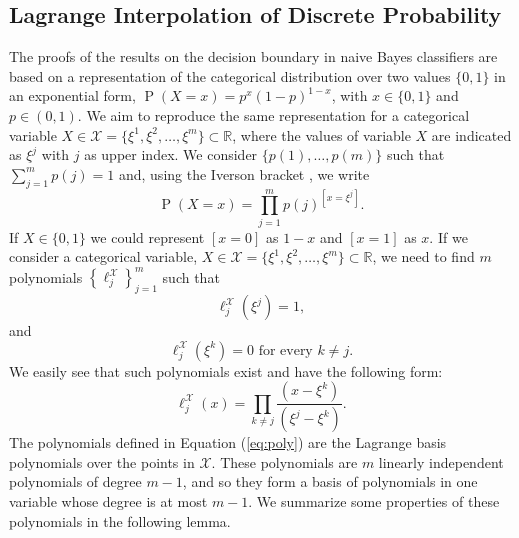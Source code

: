 \documentclass[11pt,a4paper, twoside]{book}
\newcommand{\Pp}{\operatorname{P}}
\newcommand{\nchi}{\mathcal{X}}
\begin{document}
\subsection{Lagrange Interpolation of Discrete Probability}

The proofs of the results on the decision boundary in naive Bayes classifiers are based on a representation of the categorical distribution over two values $\{0,1\}$ in an exponential form, $\Pp(X=x)=p^x(1-p)^{1-x}$, with $x\in \{0,1\}$ and $p\in (0,1)$. We aim to reproduce the same representation for a categorical variable $X \in \nchi=\{\xi^1,\xi^2,\ldots,\xi^m\} \subset \mathbb{R}$, { where the values of variable $X$ are indicated as $\xi^j$ with $j$ as upper index.} We consider $\{ p(1),\ldots,p(m)\} $ such that $\sum_{j=1}^m p(j)=1$ and, using the Iverson bracket \citep{Iverson1962}, we write 
\begin{equation} \Pp(X=x)=\prod_{j=1}^m p(j)^{[x=\xi^j]} . \label{eq:prob-iverson} \end{equation}
If $X \in \{ 0 ,1 \}$ we could represent $[x=0]$ as $1-x$ and $[x=1]$ as $x$.
If we consider a categorical variable,  $X \in \nchi=\{\xi^1,\xi^2,\ldots,\xi^m\} \subset \mathbb{R}  $, we need to find $m$ polynomials $\left\{\ell^{\nchi}_j\right\}_{j=1}^m$ such that 
\[ \ell^{\nchi} _j(\xi^j)=1 ,\] and \[ \ell ^{\nchi} _j(\xi^k)=0  \text{ for every } k\neq j . \]
We easily see that such polynomials exist and have the following form: 
\begin{equation}
\label{eq:poly}
\ell _j^{\nchi}(x)=\prod_{ k\neq j }{\frac{(x-\xi^k)}{(\xi^j-\xi^k)}}.
\end{equation}
The polynomials defined in Equation (\ref{eq:poly}) are the Lagrange basis polynomials {\citep{abramowitz, jeffreys}} over the points in $\nchi$. These polynomials are $m$ linearly independent polynomials of degree $m-1$, and so they form a basis of polynomials in one variable whose degree is at most $m-1$.   
We summarize some properties of these polynomials in the following lemma.
\end{document}
